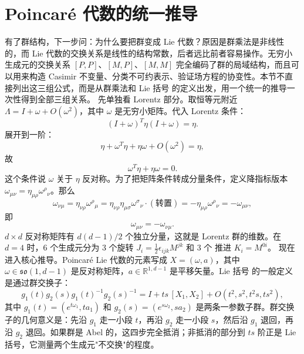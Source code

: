 \section{Poincaré 代数的统一推导}

有了群结构，下一步问：为什么要把群变成 Lie 代数？原因是群乘法是非线性的，而 Lie 代数的交换关系是线性的结构常数，后者远比前者容易操作。无穷小生成元的交换关系 $[P,P]$、$[M,P]$、$[M,M]$ 完全编码了群的局域结构，而且可以用来构造 Casimir 不变量、分类不可约表示、验证场方程的协变性。本节不直接列出这三组公式，而是从群乘法和 Lie 括号 的定义出发，用一个统一的推导一次性得到全部三组关系。
先单独看 Lorentz 部分。取恒等元附近 $\Lambda=I+\omega+O(\omega^2)$，其中 $\omega$ 是无穷小矩阵。代入 Lorentz 条件：
\begin{equation*}
(I+\omega)^T\eta(I+\omega)=\eta.
\end{equation*}
展开到一阶：
\begin{equation*}
\eta+\omega^T\eta+\eta\omega+O(\omega^2)=\eta,
\end{equation*}
故
\begin{equation}
\omega^T\eta+\eta\omega=0.
\end{equation}
这个条件说 $\omega$ 关于 $\eta$ 反对称。为了把矩阵条件转成分量条件，定义降指标版本 $\omega_{\mu\nu}=\eta_{\mu\rho}\omega^\rho{}_\nu$。那么
\begin{equation}
\omega_{\nu\mu}=\eta_{\nu\rho}\omega^\rho{}_\mu=\eta_{\nu\rho}\eta_{\mu\sigma}\omega^\sigma{}_\nu\cdot(\text{转置})=-\eta_{\mu\rho}\omega^\rho{}_\nu=-\omega_{\mu\nu},
\end{equation}
即
\begin{equation*}\boxed{\omega_{\mu\nu}=-\omega_{\nu\mu}.}
\end{equation*}
$d\times d$ 反对称矩阵有 $d(d-1)/2$ 个独立分量，这就是 Lorentz 群的维数。在 $d=4$ 时，6 个生成元分为 3 个旋转 $J_i=\frac{1}{2}\epsilon_{ijk}M^{jk}$ 和 3 个 推进 $K_i=M^{0i}$。
现在进入核心推导。Poincaré Lie 代数的元素写成 $X=(\omega,a)$，其中 $\omega\in\mathfrak{so}(1,d-1)$ 是反对称矩阵，$a\in\mathbb{R}^{1,d-1}$ 是平移矢量。Lie 括号 的一般定义是通过群交换子：
\begin{equation}\label{eq:ms-poincare-bracket-def}
g_1(t)g_2(s)g_1(t)^{-1}g_2(s)^{-1}=I+ts\,[X_1,X_2]+O(t^2,s^2,t^2s,ts^2),
\end{equation}
其中 $g_1(t)=(e^{t\omega_1},ta_1)$ 和 $g_2(s)=(e^{s\omega_2},sa_2)$ 是两条一参数子群。群交换子的几何意义是：先沿 $g_1$ 走一小段 $t$，再沿 $g_2$ 走一小段 $s$，然后沿 $g_1$ 退回，再沿 $g_2$ 退回。如果群是 Abel 的，这四步完全抵消；非抵消的部分到 $ts$ 阶正是 Lie 括号，它测量两个生成元"不交换"的程度。

